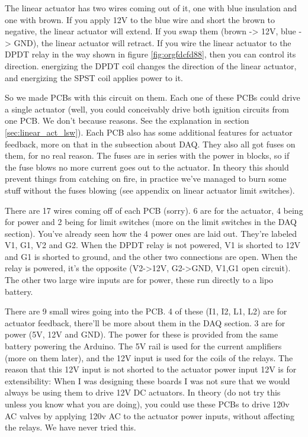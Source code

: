 \documentclass[11pt]{article}
\begin{document}
The linear actuator has two wires coming out of it, one with blue insulation and
one with brown. If you apply 12V to the blue wire and short the brown to
negative, the linear actuator will extend. If you swap them (brown -> 12V, blue
-> GND), the linear actuator will retract. If you wire the linear actuator to
the DPDT relay in the way shown in figure \ref{fig:orgfdcfd88}, then you can
control its direction. energizing the DPDT coil changes the direction of the
linear actuator, and energizing the SPST coil applies power to it.

So we made PCBs with this circuit on them. Each one of these PCBs could drive a
single actuator (well, you could conceivably drive both ignition circuits from
one PCB. We don't because reasons. See the explanation in section
\ref{sec:linear_act_lsw}). Each PCB also has some additional features for
actuator feedback, more on that in the subsection about DAQ. They also all got
fuses on them, for no real reason. The fuses are in series with the power in
blocks, so if the fuse blows no more current goes out to the actuator. In theory
this should prevent things from catching on fire, in practice we've managed to
burn some stuff without the fuses blowing (see appendix on linear actuator limit
switches).

There are 17 wires coming off of each PCB (sorry). 6 are for the actuator, 4
being for power and 2 being for limit switches (more on the limit switches in
the DAQ section). You've already seen how the 4 power ones are laid out. They're
labeled V1, G1, V2 and G2. When the DPDT relay is not powered, V1 is shorted to
12V and G1 is shorted to ground, and the other two connections are open. When
the relay is powered, it's the opposite (V2->12V, G2->GND, V1,G1 open
circuit). The other two large wire inputs are for power, these run directly to a
lipo battery.

There are 9 small wires going into the PCB. 4 of these (I1, I2, L1, L2) are for
actuator feedback, there'll be more about them in the DAQ section. 3 are for
power (5V, 12V and GND). The power for these is provided from the same battery
powering the Arduino. The 5V rail is used for the current amplifiers (more on
them later), and the 12V input is used for the coils of the relays. The reason
that this 12V input is not shorted to the actuator power input 12V is for
extensibility: When I was designing these boards I was not sure that we would
always be using them to drive 12V DC actuators. In theory (do not try this
unless you know what you are doing), you could use these PCBs to drive 120v AC
valves by applying 120v AC to the actuator power inputs, without affecting the
relays. We have never tried this.
\end{document}
